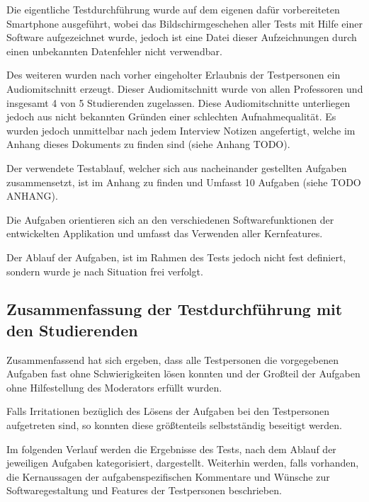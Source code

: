 \documentclass[bibliography=totoc,listof=totoc,BCOR=5mm,DIV=12,oneside]{scrbook}
\begin{document}
\par \bigskip Die eigentliche Testdurchführung wurde auf dem eigenen dafür vorbereiteten Smartphone ausgeführt, wobei das Bildschirmgeschehen aller Tests mit Hilfe einer Software aufgezeichnet wurde, jedoch ist eine Datei dieser Aufzeichnungen durch einen unbekannten Datenfehler nicht verwendbar.

\par Des weiteren wurden nach vorher eingeholter Erlaubnis der Testpersonen ein Audiomitschnitt erzeugt. Dieser Audiomitschnitt wurde von allen Professoren und insgesamt 4 von 5 Studierenden zugelassen. Diese Audiomitschnitte unterliegen jedoch aus nicht bekannten Gründen einer schlechten Aufnahmequalität. Es wurden jedoch unmittelbar nach jedem Interview Notizen angefertigt, welche im Anhang dieses Dokuments zu finden sind (siehe Anhang TODO).

\par \bigskip Der verwendete Testablauf, welcher sich aus nacheinander gestellten Aufgaben zusammensetzt, ist im Anhang zu finden und Umfasst 10 Aufgaben (siehe TODO ANHANG).
\par Die Aufgaben orientieren sich an den verschiedenen Softwarefunktionen der entwickelten Applikation und umfasst das Verwenden aller Kernfeatures. 
\par Der Ablauf der Aufgaben, ist im Rahmen des Tests jedoch nicht fest definiert, sondern wurde je nach Situation frei verfolgt.

\newpage
\subsection{Zusammenfassung der Testdurchführung mit den Studierenden}
\par Zusammenfassend hat sich ergeben, dass alle Testpersonen die vorgegebenen Aufgaben fast ohne Schwierigkeiten lösen konnten und der Großteil der Aufgaben ohne Hilfestellung des Moderators erfüllt wurden.
\par Falls Irritationen bezüglich des Lösens der Aufgaben bei den Testpersonen aufgetreten sind, so konnten diese größtenteils selbstständig beseitigt werden.

\par \bigskip Im folgenden Verlauf werden die Ergebnisse des Tests, nach dem Ablauf der jeweiligen Aufgaben kategorisiert, dargestellt. Weiterhin werden, falls vorhanden, die Kernaussagen der aufgabenspezifischen Kommentare und Wünsche zur Softwaregestaltung und Features der Testpersonen beschrieben.
\end{document}
